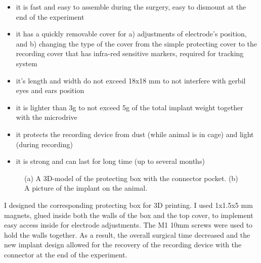 \begin{itemize}
    \item it is fast and easy to assemble during the surgery, easy to dismount at the end of the experiment
    \item it has a quickly removable cover for a) adjustments of electrode’s position, and b) changing the type of the cover from the simple protecting cover to the recording cover that has infra-red sensitive markers, required for tracking system
    \item it’s length and width do not exceed 18x18 mm to not interfere with gerbil eyes and ears position
    \item it is lighter than 3g to not exceed 5g of the total implant weight together with the microdrive
    \item it protects the recording device from dust (while animal is in cage) and light (during recording)
    \item it is strong and can last for long time (up to several months)
\end{itemize}

\begin{figure}
\captionsetup{format=plain}
\caption[Crown]{
(a) A 3D-model of the protecting box with the connector pocket. (b) A picture of the implant on the animal.
}
\label{fig:F30_crown}
\end{figure}

I designed the corresponding protecting box for 3D printing. I used 1x1.5x5 mm magnets, glued inside both the walls of the box and the top cover, to implement easy access inside for electrode adjustments. The M1 10mm screws were used to hold the walls together. As a result, the overall surgical time decreased and the new implant design allowed for the recovery of the recording device with the connector at the end of the experiment.

